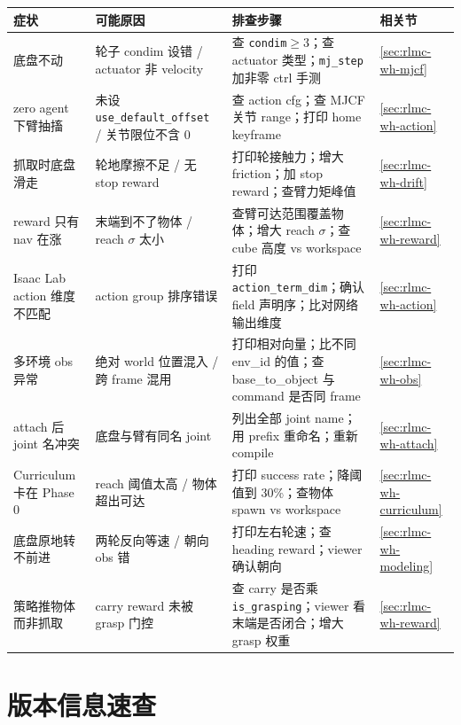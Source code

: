 \begin{center}
\small
\begin{tabular}{@{}p{3.2cm}p{3.4cm}p{4.4cm}p{1.8cm}@{}}
\toprule
症状 & 可能原因 & 排查步骤 & 相关节 \\
\midrule
底盘不动 & 轮子 condim 设错 / actuator 非 velocity & 查 \verb|condim|$\ge3$；查 actuator 类型；\verb|mj_step| 加非零 ctrl 手测 & \cref{sec:rlmc-wh-mjcf} \\
zero agent 下臂抽搐 & 未设 \verb|use_default_offset| / 关节限位不含 0 & 查 action cfg；查 MJCF 关节 range；打印 home keyframe & \cref{sec:rlmc-wh-action} \\
抓取时底盘滑走 & 轮地摩擦不足 / 无 stop reward & 打印轮接触力；增大 friction；加 stop reward；查臂力矩峰值 & \cref{sec:rlmc-wh-drift} \\
reward 只有 nav 在涨 & 末端到不了物体 / reach $\sigma$ 太小 & 查臂可达范围覆盖物体；增大 reach $\sigma$；查 cube 高度 vs workspace & \cref{sec:rlmc-wh-reward} \\
Isaac Lab action 维度不匹配 & action group 排序错误 & 打印 \verb|action_term_dim|；确认 field 声明序；比对网络输出维度 & \cref{sec:rlmc-wh-action} \\
多环境 obs 异常 & 绝对 world 位置混入 / 跨 frame 混用 & 打印相对向量；比不同 env\_id 的值；查 base\_to\_object 与 command 是否同 frame & \cref{sec:rlmc-wh-obs} \\
attach 后 joint 名冲突 & 底盘与臂有同名 joint & 列出全部 joint name；用 prefix 重命名；重新 compile & \cref{sec:rlmc-wh-attach} \\
Curriculum 卡在 Phase 0 & reach 阈值太高 / 物体超出可达 & 打印 success rate；降阈值到 30\%；查物体 spawn vs workspace & \cref{sec:rlmc-wh-curriculum} \\
底盘原地转不前进 & 两轮反向等速 / 朝向 obs 错 & 打印左右轮速；查 heading reward；viewer 确认朝向 & \cref{sec:rlmc-wh-modeling} \\
策略推物体而非抓取 & carry reward 未被 grasp 门控 & 查 carry 是否乘 \verb|is_grasping|；viewer 看末端是否闭合；增大 grasp 权重 & \cref{sec:rlmc-wh-reward} \\
\bottomrule
\end{tabular}
\end{center}

\section{版本信息速查}
\label{sec:rlmc-wh-versions}

